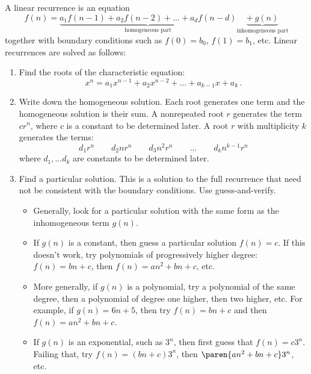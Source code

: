 A linear recurrence is an equation
\[
f(n) = \underbrace{a_1 f(n-1) + a_2 f(n-2) + \ldots + a_d f(n -
  d)}_{\text{homogeneous part}}
\underbrace{+\ g(n)}_{\text{inhomogeneous part}}
\]
together with boundary conditions such as $f(0) = b_0$, $f(1) = b_1$,
etc.  Linear recurrences are solved as follows:

\begin{enumerate}
\item Find the roots of the characteristic equation:
\[
x^n = a_1 x^{n-1} + a_2 x^{n-2} + \ldots + a_{k-1} x + a_k\, .
\]
\item Write down the homogeneous solution.  Each root generates one
  term and the homogeneous solution is their sum.  A nonrepeated root
  $r$ generates the term $c r^n$, where $c$ is a constant to be
  determined later.  A root $r$ with multiplicity $k$ generates the
  terms:
\[
d_{1} r^n \qquad d_2 n r^n \qquad d_3 n^2 r^n \qquad \ldots \qquad d_k n^{k-1} r^n
\]
where $d_1, \ldots d_k$ are constants to be determined later.

\item Find a particular solution.  This is a solution to the full
  recurrence that need not be consistent with the boundary
  conditions.  Use guess-and-verify.  
\begin{itemize}
\item Generally, look for a particular solution with the same form as
  the inhomogeneous term $g(n)$.
\item If $g(n)$ is a constant, then guess a particular solution $f(n)
  = c$.  If this doesn't work, try polynomials of progressively higher
  degree:  $f(n)=bn+c$, then $f(n)=an^2 +bn+c$, etc.
\item More generally, if $g(n)$ is a polynomial, try a polynomial of
  the same degree, then a polynomial of degree one higher, then two
  higher, etc. For example, if $g(n) = 6n + 5$, then try $f(n)=bn+c$
  and then $f(n)=an^2 +bn+c$.
\item If $g(n)$ is an exponential, such as $3^n$, then first guess
  that $f(n) = c3^n$.  Failing that, try $f(n) = (bn + c)3^n$, then
  $\paren{an^2 + bn + c}3^n$, etc.
\end{itemize}

\iffalse
If $g(n)$ is a polynomial, try a
  polynomial of the same degree, then of one higher degree, then two
  higher.  For example, if $g(n) = n$, then try $f(n) = bn + c$ and
  then $an^2 + bn + c$.  If $g(n)$ is an exponential, such as $3^n$,
  then first guess $f(n) = c3^n$.  Failing that, try $f(n) = bn3^n$, then
  $(bn + c)3^n$, $\paren{an^2 + bn + c}3^n$, etc.
\fi



\end{enumerate}
